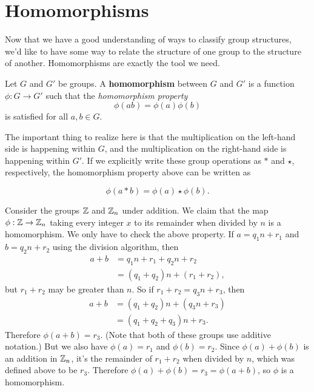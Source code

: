 \section{Homomorphisms}

Now that we have a good understanding of ways to classify group structures, we'd like to have some way to relate the structure of one group to the structure of another. Homomorphisms are exactly the tool we need. 

\begin{definition}
Let $G$ and $G'$ be groups. A \textbf{homomorphism} between $G$ and $G'$ is a function $\phi: G \to G'$ such that the \textit{homomorphism property}
\begin{equation*}
    \phi(ab) = \phi(a)\phi(b)
\end{equation*}
is satisfied for all $a, b \in G$.
\end{definition}

The important thing to realize here is that the multiplication on the left-hand side is happening within $G$, and the multiplication on the right-hand side is happening within $G'$. If we explicitly write these group operations as $*$ and $\star$, respectively, the homomorphism property above can be written as

\begin{equation*}
    \phi(a*b) = \phi(a) \star \phi(b).
\end{equation*}

\begin{example}
Consider the groups $\z$ and $\zn[n]$ under addition. We claim that the map $\phi: \z \to \zn[n]$ taking every integer $x$ to its remainder when divided by $n$ is a homomorphism. We only have to check the above property. If $a = q_1n + r_1$ and $b = q_2n + r_2$ using the division algorithm, then
\begin{align*}
    a + b &= q_1n + r_1 + q_2n + r_2 \\
          &= (q_1 + q_2)n + (r_1 + r_2),
\end{align*}
but $r_1 + r_2$ may be greater than $n$. So if $r_1 + r_2 = q_3n + r_3$, then 
\begin{align*}
    a + b &= (q_1 + q_2)n + (q_3n + r_3)  \\
          &= (q_1 + q_2 + q_3)n + r_3.
\end{align*}
Therefore $\phi(a + b) = r_3$. (Note that both of these groups use additive notation.) But we also have $\phi(a) = r_1$ and $\phi(b) = r_2$. Since $\phi(a) + \phi(b)$ is an addition in $\zn[n]$, it's the remainder of $r_1 + r_2$ when divided by $n$, which was defined above to be $r_3$. Therefore $\phi(a) + \phi(b) = r_3 = \phi(a + b)$, so $\phi$ is a homomorphism.
\end{example}

